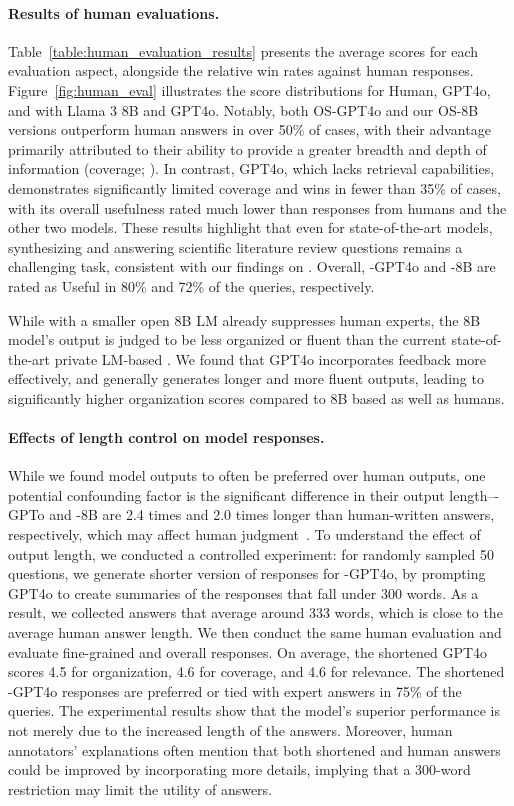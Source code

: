 \paragraph{Results of human evaluations.}
Table~\ref{table:human_evaluation_results} presents the average scores for each evaluation aspect, alongside the relative win rates against human responses. 
Figure~\ref{fig:human_eval} illustrates the score distributions for Human, GPT4o, and \model with Llama 3 8B and GPT4o. 
Notably, both OS-GPT4o and our OS-8B versions outperform human answers in over 50\% of cases, with their advantage primarily attributed to their ability to provide a greater breadth and depth of information (coverage; \covh). In contrast, GPT4o, which lacks retrieval capabilities, demonstrates significantly limited coverage and wins in fewer than 35\% of cases, with its overall usefulness rated much lower than responses from humans and the other two models. These results highlight that even for state-of-the-art models, synthesizing and answering scientific literature review questions remains a challenging task, consistent with our findings on \data. 
Overall, \model-GPT4o and \model-8B are rated as Useful in 80\% and 72\% of the queries, respectively. 

While \model with a smaller open 8B LM already suppresses human experts, the 8B model's output is judged to be less organized or fluent than the current state-of-the-art private LM-based \model. We found that GPT4o incorporates feedback more effectively, and generally generates longer and more fluent outputs, leading to significantly higher organization scores compared to 8B based \model as well as humans. 


\paragraph{Effects of length control on model responses. }
While we found model outputs to often be preferred over human outputs, one potential confounding factor is the significant difference in their output length--\model-GPTo and \model-8B are 2.4 times and 2.0 times longer than human-written answers, respectively, which may affect human judgment~\cite{dubois2024length}. 
To understand the effect of output length, we conducted a controlled experiment: for randomly sampled 50 questions, we generate shorter version of responses for \model-GPT4o, by prompting GPT4o to create summaries of the responses that fall under 300 words. As a result, we collected \model answers that average around 333 words, which is close to the average human answer length. 
We then conduct the same human evaluation and evaluate fine-grained and overall responses. 
On average, the shortened GPT4o scores 4.5 for organization, 4.6 for coverage, and 4.6 for relevance. 
The shortened \model-GPT4o responses are preferred or tied with expert answers in 75\% of the queries. 
The experimental results show that the model's superior performance is not merely due to the increased length of the \model answers. Moreover, human annotators' explanations often mention that both shortened \model and human answers could be improved by incorporating more details, implying that a 300-word restriction may limit the utility of answers.  



